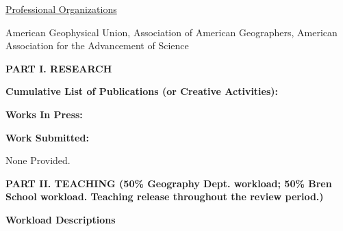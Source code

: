 \documentclass[10pt]{article}
\begin{document}
\vspace{0.5cm}
\underline{Professional Organizations}

American Geophysical Union, Association of American Geographers, American Association for the Advancement of Science

\vspace{0.5cm}

\newpage

\textbf{PART I.  RESEARCH}

\vspace{0.2cm}
{\bf Cumulative List of Publications (or Creative Activities):}

{\setlength{\extrarowheight}{3.5pt}
}

\vspace{0.2cm}
{\bf Works In Press:}

{\setlength{\extrarowheight}{3.5pt}

}

 

\vspace{0.2cm}

{\bf Work Submitted:}


% 
None Provided.


\vspace{1cm}
\textbf{PART II.  TEACHING (50\% Geography Dept. workload; 50\% Bren School workload. Teaching release throughout the review period.)}

\vspace{0.5cm}

\textbf{Workload Descriptions}
\end{document}
